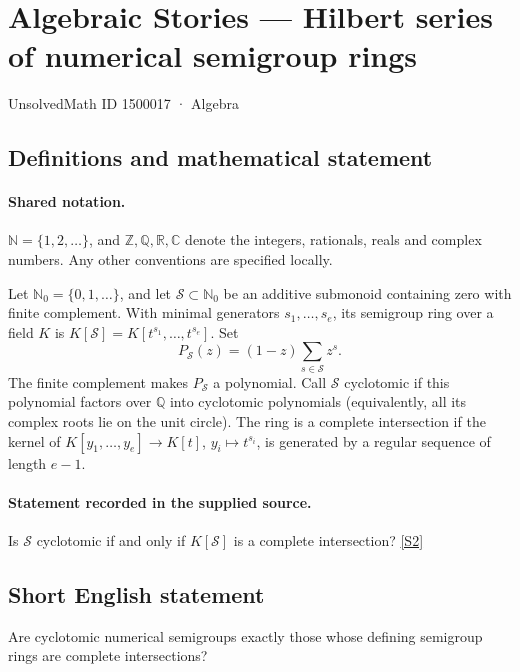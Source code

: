 \documentclass[11pt]{article}
\newcommand{\sref}[2]{\hyperlink{source:#1:#2}{[S#2]}}
\begin{document}
\setcounter{section}{1500016}
\section{Algebraic Stories — Hilbert series of numerical semigroup rings}\label{1500017}
{\small\sffamily UnsolvedMath ID 1500017 · Algebra}
\subsection{Definitions and mathematical statement}

\paragraph{Shared notation.}$\mathbb N=\{1,2,\ldots\}$, and $\mathbb Z,\mathbb Q,\mathbb R,\mathbb C$ denote the integers, rationals, reals and complex numbers. Any other conventions are specified locally.


Let $\mathbb N_0=\{0,1,\ldots\}$, and let $\mathcal S\subset\mathbb N_0$ be an additive submonoid containing zero with finite complement. With minimal generators $s_1,\ldots,s_e$, its semigroup ring over a field $K$ is $K[\mathcal S]=K[t^{s_1},\ldots,t^{s_e}]$. Set
\[P_{\mathcal S}(z)=(1-z)\sum_{s\in\mathcal S}z^s.
\]
The finite complement makes $P_{\mathcal S}$ a polynomial. Call $\mathcal S$ cyclotomic if this polynomial factors over $\mathbb Q$ into cyclotomic polynomials (equivalently, all its complex roots lie on the unit circle). The ring is a complete intersection if the kernel of $K[y_1,\ldots,y_e]\to K[t]$, $y_i\mapsto t^{s_i}$, is generated by a regular sequence of length $e-1$.
\paragraph{Statement recorded in the supplied source.}
Is $\mathcal S$ cyclotomic if and only if $K[\mathcal S]$ is a complete intersection? \sref{1500017}{2}
\subsection{Short English statement}
Are cyclotomic numerical semigroups exactly those whose defining semigroup rings are complete intersections?
\end{document}
